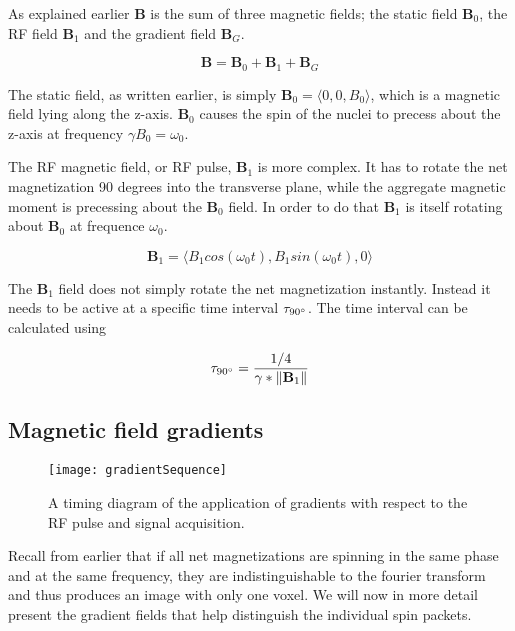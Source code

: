 

As explained earlier $\mathbf{B}$ is the sum of three magnetic fields;
the static field $\mathbf{B}_0$, the RF field $\mathbf{B}_1$ and the
gradient field $\mathbf{B}_G$.

\begin{displaymath}
  \mathbf{B} = \mathbf{B}_0 + \mathbf{B}_1 + \mathbf{B}_G
\end{displaymath}

The static field, as written earlier, is simply $\mathbf{B}_0 =
\langle 0, 0, B_0 \rangle$, which is a magnetic field lying along the
z-axis. $\mathbf{B}_0$ causes the spin of the nuclei to precess about
the z-axis at frequency $\gamma B_0 = \omega_0$.

The RF magnetic field, or RF pulse, $\mathbf{B}_1$ is more complex. It
has to rotate the net magnetization 90 degrees into the transverse
plane, while the aggregate magnetic moment is precessing about the
$\mathbf{B}_0$ field. In order to do that $\mathbf{B}_1$ is itself
rotating about $\mathbf{B}_0$ at frequence $\omega_0$.

\begin{displaymath}
  \mathbf{B}_1 = \langle B_1 cos(\omega_0 t), B_1 sin(\omega_0 t), 0\rangle
\end{displaymath}

The $\mathbf{B}_1$ field does not simply rotate the net magnetization
instantly. Instead it needs to be active at a specific time interval
$\tau_{90^\circ}$. The time interval can be calculated using

\begin{displaymath}
  \tau_{90^\circ} = \frac{1 / 4}{\gamma * \|\mathbf{B}_1\|}
\end{displaymath}

\subsection{Magnetic field gradients}

\begin{figure}
  \centering
  \texttt{[image: gradientSequence]}
  \caption{A timing diagram of the application of gradients with
    respect to the RF pulse and signal acquisition.}
  \label{fig:gradientSequence}
\end{figure}

Recall from earlier that if all net magnetizations are spinning in the
same phase and at the same frequency, they are indistinguishable to
the fourier transform and thus produces an image with only one
voxel. We will now in more detail present the gradient fields that
help distinguish the individual spin packets.

